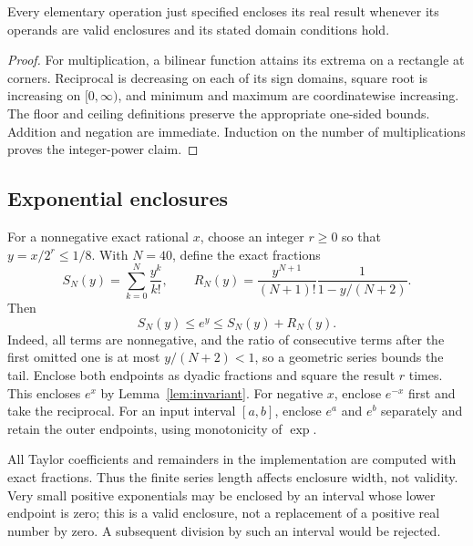 \begin{lemma}\label{lem:invariant}
Every elementary operation just specified encloses its real result whenever
its operands are valid enclosures and its stated domain conditions hold.
\end{lemma}
\begin{proof}
For multiplication, a bilinear function attains its extrema on a rectangle
at corners. Reciprocal is decreasing on each of its sign domains, square
root is increasing on $[0,\infty)$, and minimum and maximum are coordinatewise
increasing. The floor and ceiling definitions preserve the appropriate
one-sided bounds. Addition and negation are immediate. Induction on the
number of multiplications proves the integer-power claim.
\end{proof}

\subsection{Exponential enclosures}
For a nonnegative exact rational $x$, choose an integer $r\ge0$ so that
$y=x/2^r\le1/8$. With $N=40$, define the exact fractions
\[
 S_N(y)=\sum_{k=0}^N\frac{y^k}{k!},\qquad
 R_N(y)=\frac{y^{N+1}}{(N+1)!}\frac1{1-y/(N+2)}.
\]
Then
\begin{equation}\label{eq:exp-enclosure}
 S_N(y)\le e^y\le S_N(y)+R_N(y).
\end{equation}
Indeed, all terms are nonnegative, and the ratio of consecutive terms after
the first omitted one is at most $y/(N+2)<1$, so a geometric series bounds
the tail. Enclose both endpoints as dyadic fractions and square the result
$r$ times. This encloses $e^x$ by Lemma~\ref{lem:invariant}. For negative
$x$, enclose $e^{-x}$ first and take the reciprocal. For an input interval
$[a,b]$, enclose $e^a$ and $e^b$ separately and retain the outer endpoints,
using monotonicity of $\exp$.

All Taylor coefficients and remainders in the implementation are computed
with exact fractions. Thus the finite series length affects enclosure width,
not validity. Very small positive exponentials may be enclosed by an interval
whose lower endpoint is zero; this is a valid enclosure, not a replacement
of a positive real number by zero. A subsequent division by such an interval
would be rejected.

